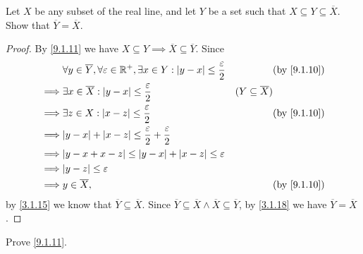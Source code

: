 \exercisesection

\begin{ex}\label{ex:9.1.1}
  Let \(X\) be any subset of the real line, and let \(Y\) be a set such that \(X \subseteq Y \subseteq \overline{X}\).
  Show that \(\overline{Y} = \overline{X}\).
\end{ex}

\begin{proof}
  By \cref{9.1.11} we have \(X \subseteq Y \implies \overline{X} \subseteq \overline{Y}\).
  Since
  \begin{align*}
             & \forall y \in \overline{Y}, \forall \varepsilon \in \R^+, \exists x \in Y : \abs{y - x} \leq \dfrac{\varepsilon}{2} &                            & \by{9.1.10} \\
    \implies & \exists x \in \overline{X} : \abs{y - x} \leq \dfrac{\varepsilon}{2}                                                & (Y \subseteq \overline{X})               \\
    \implies & \exists z \in X : \abs{x - z} \leq \dfrac{\varepsilon}{2}                                                           &                            & \by{9.1.10} \\
    \implies & \abs{y - x} + \abs{x - z} \leq \dfrac{\varepsilon}{2} + \dfrac{\varepsilon}{2}                                                                                 \\
    \implies & \abs{y - x + x - z} \leq \abs{y - x} + \abs{x - z} \leq \varepsilon                                                                                            \\
    \implies & \abs{y - z} \leq \varepsilon                                                                                                                                   \\
    \implies & y \in \overline{X},                                                                                                 &                            & \by{9.1.10}
  \end{align*}
  by \cref{3.1.15} we know that \(\overline{Y} \subseteq \overline{X}\).
  Since \(\overline{Y} \subseteq \overline{X} \land \overline{X} \subseteq \overline{Y}\), by \cref{3.1.18} we have \(\overline{Y} = \overline{X}\).
\end{proof}

\begin{ex}\label{ex:9.1.2}
  Prove \cref{9.1.11}.
\end{ex}

